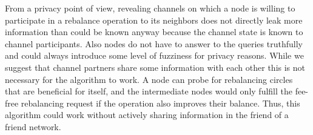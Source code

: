 \documentclass[a4paper]{paper}
\begin{document}
From a privacy point of view, revealing channels on which a node is willing to participate in a rebalance operation to its neighbors does not directly leak more information than could be known anyway because the channel state is known to channel participants.
Also nodes do not have to answer to the queries truthfully and could always introduce some level of fuzziness for privacy reasons. 
While we suggest that channel partners share some information with each other this is not necessary for the algorithm to work.
A node can probe for rebalancing circles that are beneficial for itself, 
and the intermediate nodes would only fulfill the fee-free rebalancing request if the operation also improves their balance. 
Thus, this algorithm could work without actively sharing information in the friend of a friend network.




\end{document}
